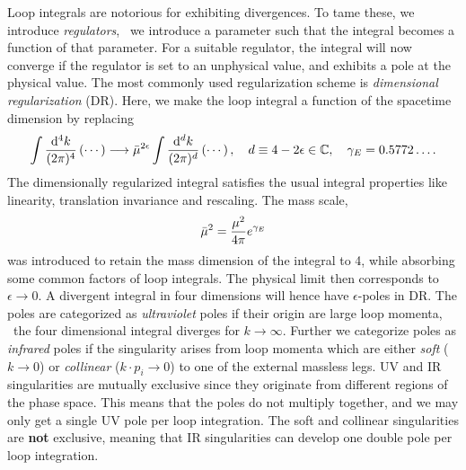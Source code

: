 Loop integrals are notorious for exhibiting divergences. To tame these, we introduce \textit{regulators}, \ie\ we introduce a parameter such that the integral becomes a function of that parameter. For a suitable regulator, the integral will now converge if the regulator is set to an unphysical value, and exhibits a pole at the physical value. The most commonly used regularization scheme is \textit{dimensional regularization} (\acs{DR}). Here, we make the loop integral a function of the spacetime dimension by replacing
\begin{equation}
\int \frac{\mathrm{d}^4 k}{(2 \pi)^4} \left( \cdots \right) \longrightarrow \bar{\mu}^{2 \epsilon} \int \frac{\mathrm{d}^d k}{(2 \pi)^d} \left( \cdots \right), \quad d \equiv 4 - 2 \epsilon \in \mathbb{C}, \quad \gamma_E =  0.5772\ldots.
\end{equation}
The dimensionally regularized integral satisfies the usual integral properties like linearity, translation invariance and rescaling. The mass scale,
\begin{equation}
\bar{\mu}^2 = \frac{\mu^2}{4 \pi} e^{\gamma_E}
\end{equation}
was introduced to retain the mass dimension of the integral to 4, while absorbing some common factors of loop integrals. The physical limit then corresponds to $\epsilon \rightarrow 0$. A divergent integral in four dimensions will hence have $\epsilon$-poles in \acs{DR}. The poles are categorized as \textit{ultraviolet} poles if their origin are large loop momenta, \ie\ the four dimensional integral diverges for $k \rightarrow \infty$. Further we categorize poles as \textit{infrared} poles if the singularity arises from loop momenta which are either \textit{soft} ($k \rightarrow 0$) or \textit{collinear} ($k \cdot p_i \rightarrow 0$) to one of the external massless legs. \acs{UV} and \acs{IR} singularities are mutually exclusive since they originate from different regions of the phase space. This means that the poles do not multiply together, and we may only get a single \acs{UV} pole per loop integration. The soft and collinear singularities are \textbf{not} exclusive, meaning that \acs{IR} singularities can develop one double pole per loop integration.

